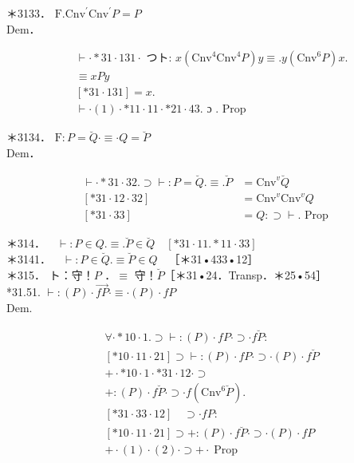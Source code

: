 \documentclass[10pt]{article}
\begin{document}
＊3133． $\mathrm{F} . \mathrm{Cnv}^{\prime} \mathrm{Cnv}^{\prime} P=P$\\
Dem．


\begin{align*}
& \vdash \cdot * 31 \cdot 131 \cdot \text { つト: } x\left(\mathrm{Cnv}^{4} \mathrm{Cnv}^{4} P\right) y \equiv . y\left(\mathrm{Cnv}^{6} P\right) x . \\
& \equiv x P y  \tag{1}\\
& {[* 31 \cdot 131] }=x . \\
& \vdash \cdot(1) \cdot * 11 \cdot 11 \cdot * 21 \cdot 43 . \text { ɔ } . \text { Prop }
\end{align*}


＊3134． $\mathrm{F}: P=\breve{Q} \cdot \equiv \cdot Q=\breve{P}$\\
Dem．

$$
\begin{array}{ll}
\vdash \cdot * 31 \cdot 32 . \supset \vdash: P=\breve{Q} . \equiv . \breve{P} & =\mathrm{Cnv}^{v} \breve{Q} \\
{[* 31 \cdot 12 \cdot 32]} & =\mathrm{Cnv}^{v} \mathrm{Cnv}^{v} Q \\
{[* 31 \cdot 33]} & =Q: \supset \vdash . \text { Prop }
\end{array}
$$

＊314．$\quad \vdash: P \in Q . \equiv . \breve{P} \in \breve{Q} \quad[* 31 \cdot 11 . * 11 \cdot 33]$\\
＊3141．$\quad \vdash: P \in \breve{Q} . \equiv \breve{P} \in Q \quad$［＊31•433•12］\\
＊315． ト：守！$P$ ．$\equiv$ 守！$\breve{P}$［＊31•24．Transp．＊25•54］\\
*31.51. $\vdash:(P) \cdot \overrightarrow{f P} \cdot \equiv \cdot(P) \cdot f P$\\
Dem.


\begin{align*}
& \forall \cdot * 10 \cdot 1 . \supset \vdash:(P) \cdot f P \cdot \supset \cdot f \breve{P}: \\
& {[* 10 \cdot 11 \cdot 21] } \supset \vdash:(P) \cdot f P \cdot \supset \cdot(P) \cdot f \breve{P}  \tag{1}\\
&+\cdot * 10 \cdot 1 \cdot * 31 \cdot 12 \cdot \supset \\
&+:(P) \cdot f \breve{P} \cdot \supset \cdot f\left(\mathrm{Cnv}^{6} \breve{P}\right) . \\
& {[* 31 \cdot 33 \cdot 12] \quad } \supset \cdot f P: \\
& {[* 10 \cdot 11 \cdot 21] \supset+:(P) \cdot f \breve{P} \cdot \supset \cdot(P) \cdot f P }  \tag{2}\\
&+\cdot(1) \cdot(2) \cdot \supset+\cdot \operatorname{Prop}
\end{align*}
\end{document}

